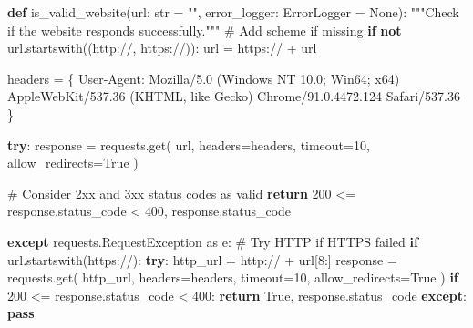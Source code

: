 \documentclass[
  titlepage]{article}
\newenvironment{Shaded}{\begin{snugshade}}{\end{snugshade}}
\newcommand{\BuiltInTok}[1]{\textcolor[rgb]{0.00,0.23,0.31}{#1}}
\newcommand{\CommentTok}[1]{\textcolor[rgb]{0.37,0.37,0.37}{#1}}
\newcommand{\ControlFlowTok}[1]{\textcolor[rgb]{0.00,0.23,0.31}{\textbf{#1}}}
\newcommand{\DecValTok}[1]{\textcolor[rgb]{0.68,0.00,0.00}{#1}}
\newcommand{\ImportTok}[1]{\textcolor[rgb]{0.00,0.46,0.62}{#1}}
\newcommand{\KeywordTok}[1]{\textcolor[rgb]{0.00,0.23,0.31}{\textbf{#1}}}
\newcommand{\NormalTok}[1]{\textcolor[rgb]{0.00,0.23,0.31}{#1}}
\newcommand{\OperatorTok}[1]{\textcolor[rgb]{0.37,0.37,0.37}{#1}}
\newcommand{\StringTok}[1]{\textcolor[rgb]{0.13,0.47,0.30}{#1}}
\newcommand{\VariableTok}[1]{\textcolor[rgb]{0.07,0.07,0.07}{#1}}
\begin{document}
\begin{Shaded}
\begin{Highlighting}[]
\KeywordTok{def}\NormalTok{ is\_valid\_website(url: }\BuiltInTok{str} \OperatorTok{=} \StringTok{""}\NormalTok{, error\_logger: ErrorLogger }\OperatorTok{=} \VariableTok{None}\NormalTok{):}
    \CommentTok{"""Check if the website responds successfully."""}
    \CommentTok{\# Add scheme if missing}
    \ControlFlowTok{if} \KeywordTok{not}\NormalTok{ url.startswith((}\StringTok{\textquotesingle{}http://\textquotesingle{}}\NormalTok{, }\StringTok{\textquotesingle{}https://\textquotesingle{}}\NormalTok{)):}
\NormalTok{        url }\OperatorTok{=} \StringTok{\textquotesingle{}https://\textquotesingle{}} \OperatorTok{+}\NormalTok{ url}
    
\NormalTok{    headers }\OperatorTok{=}\NormalTok{ \{}
        \StringTok{\textquotesingle{}User{-}Agent\textquotesingle{}}\NormalTok{: }\StringTok{\textquotesingle{}Mozilla/5.0 (Windows NT 10.0; Win64; x64) AppleWebKit/537.36 (KHTML, like Gecko) Chrome/91.0.4472.124 Safari/537.36\textquotesingle{}}
\NormalTok{    \}}
    
    \ControlFlowTok{try}\NormalTok{:}
\NormalTok{        response }\OperatorTok{=}\NormalTok{ requests.get(}
\NormalTok{            url,}
\NormalTok{            headers}\OperatorTok{=}\NormalTok{headers,}
\NormalTok{            timeout}\OperatorTok{=}\DecValTok{10}\NormalTok{,}
\NormalTok{            allow\_redirects}\OperatorTok{=}\VariableTok{True}
\NormalTok{        )}
        
        \CommentTok{\# Consider 2xx and 3xx status codes as valid}
        \ControlFlowTok{return} \DecValTok{200} \OperatorTok{\textless{}=}\NormalTok{ response.status\_code }\OperatorTok{\textless{}} \DecValTok{400}\NormalTok{, response.status\_code}
        
    \ControlFlowTok{except}\NormalTok{ requests.RequestException }\ImportTok{as}\NormalTok{ e:}
        \CommentTok{\# Try HTTP if HTTPS failed}
        \ControlFlowTok{if}\NormalTok{ url.startswith(}\StringTok{\textquotesingle{}https://\textquotesingle{}}\NormalTok{):}
            \ControlFlowTok{try}\NormalTok{:}
\NormalTok{                http\_url }\OperatorTok{=} \StringTok{\textquotesingle{}http://\textquotesingle{}} \OperatorTok{+}\NormalTok{ url[}\DecValTok{8}\NormalTok{:]}
\NormalTok{                response }\OperatorTok{=}\NormalTok{ requests.get(}
\NormalTok{                    http\_url,}
\NormalTok{                    headers}\OperatorTok{=}\NormalTok{headers,}
\NormalTok{                    timeout}\OperatorTok{=}\DecValTok{10}\NormalTok{,}
\NormalTok{                    allow\_redirects}\OperatorTok{=}\VariableTok{True}
\NormalTok{                )}
                \ControlFlowTok{if} \DecValTok{200} \OperatorTok{\textless{}=}\NormalTok{ response.status\_code }\OperatorTok{\textless{}} \DecValTok{400}\NormalTok{:}
                    \ControlFlowTok{return} \VariableTok{True}\NormalTok{, response.status\_code}
            \ControlFlowTok{except}\NormalTok{:}
                \ControlFlowTok{pass}
                

\end{Highlighting}
\end{Shaded}
\end{document}
